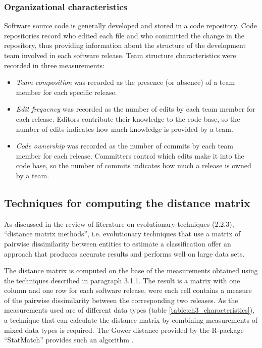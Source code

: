 \subsubsection{Organizational characteristics}
Software source code is generally developed and stored in a code repository. Code repositories record who edited each file and who committed the change in the repository, thus providing information about the structure of the development team involved in each software release. Team structure characteristics were recorded in three measurements:

\begin{itemize}
\item{\textit{Team composition} was recorded as the presence (or absence) of a team member for each specific release.}
  
\item{\textit{Edit frequency} was recorded as the number of edits by each team member for each release. Editors contribute their knowledge to the code base, so the number of edits indicates how much knowledge is provided by a team.}

\item{\textit{Code ownership} was recorded as the number of commits by each team member for each release. Committers control which edits make it into the code base, so the number of commits indicates how much a release is owned by a team.}
\end{itemize}



\subsection{Techniques for computing the distance matrix}
As discussed in the review of literature on evolutionary techniques (2.2.3), “distance matrix methods”, i.e. evolutionary techniques that use a matrix of pairwise dissimilarity between entities to estimate a classification \citep{FelsensteinJ.andFelenstein2004a} offer an approach that produces accurate results and performs well on large data sets.

The distance matrix is computed on the base of the measurements obtained using the techniques described in paragraph 3.1.1. The result is a matrix with one column and one row for each software release, were each cell contains a measure of the pairwise dissimilarity between the corresponding two releases. As the measurements used are of different data types (table \ref{table:ch3_characteristics}), a technique that can calculate the distance matrix by combining measurements of mixed data types is required. The Gower distance provided by the R-package “StatMatch” provides such an algorithm \citep{DOrazio2016}.

